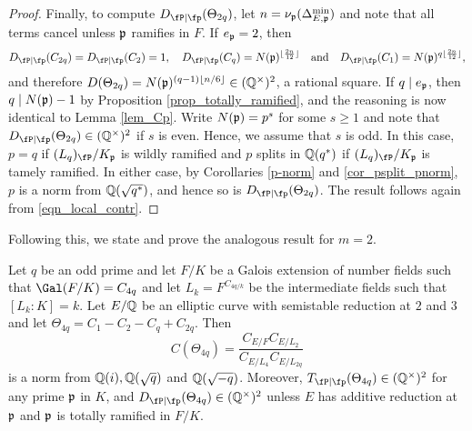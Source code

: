 \begin{proof}
    Finally, to compute $\Dp(\Theta_{2q})$, let $n=\nu_{\mathfrak{p}}(\Delta_{E,\mathfrak{p}}^{\min})$ and note that all terms cancel unless $\mathfrak{p}$ ramifies in $F$. If $e_{\mathfrak{p}}=2$, then
    \begin{equation}\label{eqn_ep=2}
        \Dp(C_{2q})=\Dp(C_2)=1,\quad \Dp(C_q)=N(\pp)^{\floor{\frac{2n}{12}}}\quad\text{and}\quad \Dp(C_1)=N(\pp)^{q\floor{\frac{2n}{12}}},
    \end{equation}
    and therefore $D(\Theta_{2q})=N(\mathfrak{p})^{(q-1)\lfloor n/6\rfloor}\in(\mathbb{Q}^{\times})^2$, a rational square. If $q\mid e_{\mathfrak{p}}$, then $q\mid N(\mathfrak{p})-1$ by Proposition \ref{prop_totally_ramified}, and the reasoning is now identical to Lemma \ref{lem_Cp}. Write $N(\mathfrak{p})=p^s$ for some $s\geq1$ and note that $\Dp(\Theta_{2q})\in\QQss$ if $s$ is even. Hence, we assume that $s$ is odd. In this case, $p=q$ if $(L_q)_\fP/K_\pp$ is wildly ramified and $p$ splits in $\mathbb{Q}(q^*)$ if $(L_q)_\fP/K_\pp$ is tamely ramified. In either case, by Corollaries \ref{p-norm} and \ref{cor_psplit_pnorm}, $p$ is a norm from $\mathbb{Q}(\sqrt{q^*})$, and hence so is $\Dp(\Theta_{2q})$.
    The result follows again from \eqref{eqn_local_contr}.
\end{proof}

Following this, we state and prove the analogous result for $m=2$.

\begin{lemma}\label{lem_C4p}
    Let $q$ be an odd prime and let $F/K$ be a Galois extension of number fields such that $\Gal(F/K)=C_{4q}$ and let $L_k=F^{C_{4q/k}}$ be the intermediate fields such that $[L_k:K]=k$. Let $E/\mathbb{Q}$ be an elliptic curve with semistable reduction at $2$ and $3$ and let $\Theta_{4q}=C_1-C_2-C_q+C_{2q}$. Then 
    $$C(\Theta_{4q})=\frac{C_{E/F}C_{E/L_2}}{C_{E/L_4}C_{E/L_{2q}}}$$
    is a norm from $\mathbb{Q}(i),\mathbb{Q}(\sqrt{q})$ and $\mathbb{Q}(\sqrt{-q})$. Moreover, $\Tp(\Theta_{4q})\in\QQss$ for any prime $\mathfrak{p}$ in $K$, and $\Dp(\Theta_{4q})\in\QQss$ unless $E$ has additive reduction at $\mathfrak{p}$ and $\mathfrak{p}$ is totally ramified in $F/K$.
\end{lemma}

